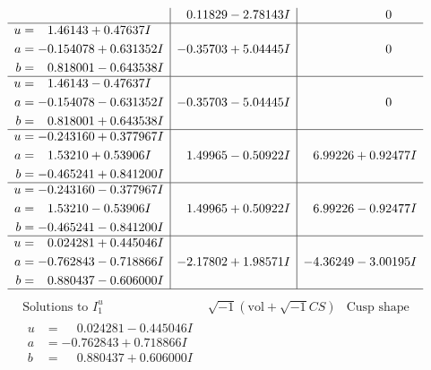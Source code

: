 \documentclass[1p]{elsarticle_modified}
\theoremstyle{definition}
\newcommand{\I}{\sqrt{-1}}
\begin{document}
$$\begin{array}{c|c|c}
 & \phantom{-}0.11829 - 2.78143 I & \phantom{-0.000000 } 0 \\ \hline\begin{aligned}
u &= \phantom{-}1.46143 + 0.47637 I \\
a &= -0.154078 + 0.631352 I \\
b &= \phantom{-}0.818001 - 0.643538 I\end{aligned}
 & -0.35703 + 5.04445 I & \phantom{-0.000000 } 0 \\ \hline\begin{aligned}
u &= \phantom{-}1.46143 - 0.47637 I \\
a &= -0.154078 - 0.631352 I \\
b &= \phantom{-}0.818001 + 0.643538 I\end{aligned}
 & -0.35703 - 5.04445 I & \phantom{-0.000000 } 0 \\ \hline\begin{aligned}
u &= -0.243160 + 0.377967 I \\
a &= \phantom{-}1.53210 + 0.53906 I \\
b &= -0.465241 + 0.841200 I\end{aligned}
 & \phantom{-}1.49965 - 0.50922 I & \phantom{-}6.99226 + 0.92477 I \\ \hline\begin{aligned}
u &= -0.243160 - 0.377967 I \\
a &= \phantom{-}1.53210 - 0.53906 I \\
b &= -0.465241 - 0.841200 I\end{aligned}
 & \phantom{-}1.49965 + 0.50922 I & \phantom{-}6.99226 - 0.92477 I \\ \hline\begin{aligned}
u &= \phantom{-}0.024281 + 0.445046 I \\
a &= -0.762843 - 0.718866 I \\
b &= \phantom{-}0.880437 - 0.606000 I\end{aligned}
 & -2.17802 + 1.98571 I & -4.36249 - 3.00195 I\\
 \hline 
 \end{array}$$\newpage$$\begin{array}{c|c|c}  
\text{Solutions to }I^u_{1}& \I (\text{vol} + \sqrt{-1}CS) & \text{Cusp shape}\\
 \hline 
\begin{aligned}
u &= \phantom{-}0.024281 - 0.445046 I \\
a &= -0.762843 + 0.718866 I \\
b &= \phantom{-}0.880437 + 0.606000 I\end{aligned}

\end{array}$$
\end{document}
